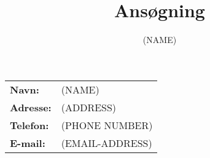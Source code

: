 \documentclass[10pt]{article}
\title{Ansøgning }
\author{(NAME)}
\begin{document}
\maketitle


\begin{tabular}{l l}
\textbf{Navn:} & (NAME) \\ 
\textbf{Adresse:} & (ADDRESS) \\ 
\textbf{Telefon:} & (PHONE NUMBER) \\ 
\textbf{E-mail:} & (EMAIL-ADDRESS) \\ 
\end{tabular} 
\end{document}
